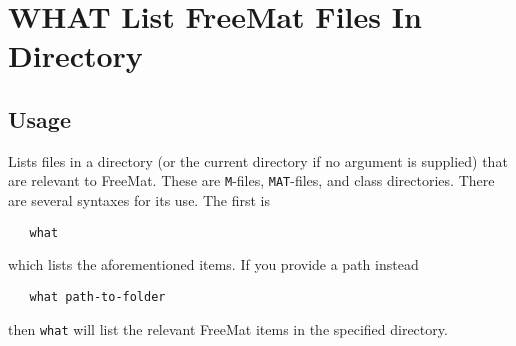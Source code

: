 \section{WHAT List FreeMat Files In Directory}

\subsection{Usage}

Lists files in a directory (or the current directory if no
argument is supplied) that are relevant to FreeMat.  These
are \verb|M|-files, \verb|MAT|-files, and class directories.  There
are several syntaxes for its use.  The first is
\begin{verbatim}
   what
\end{verbatim}
which lists the aforementioned items.  If you provide a 
path instead
\begin{verbatim}
   what path-to-folder
\end{verbatim}
then \verb|what| will list the relevant FreeMat items in the specified
directory.
